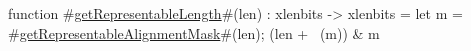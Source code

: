 function #\hyperref[sailRISCVzgetRepresentableLength]{getRepresentableLength}#(len) : xlenbits -> xlenbits = {
  let m = #\hyperref[sailRISCVzgetRepresentableAlignmentMask]{getRepresentableAlignmentMask}#(len);
  (len + ~(m)) & m
}
